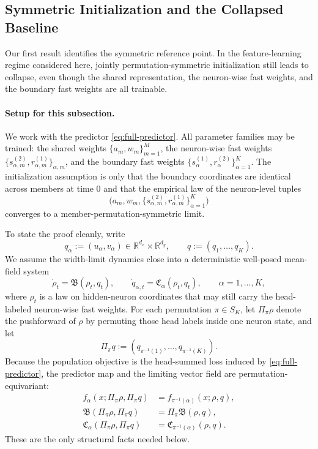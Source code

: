 \documentclass{article}
\newcommand{\R}{\mathbb{R}}
\begin{document}
\subsection{Symmetric Initialization and the Collapsed Baseline}

Our first result identifies the symmetric reference point. In the feature-learning regime considered here, jointly permutation-symmetric initialization still leads to collapse, even though the shared representation, the neuron-wise fast weights, and the boundary fast weights are all trainable.

\paragraph{Setup for this subsection.}
We work with the predictor \eqref{eq:full-predictor}. All parameter families may be trained: the shared weights $\{a_m,w_m\}_{m=1}^M$, the neuron-wise fast weights $\{s^{(2)}_{\alpha,m},r^{(1)}_{\alpha,m}\}_{\alpha,m}$, and the boundary fast weights $\{s^{(1)}_\alpha,r^{(2)}_\alpha\}_{\alpha=1}^K$. The initialization assumption is only that the boundary coordinates are identical across members at time $0$ and that the empirical law of the neuron-level tuples
\[
\bigl(a_m,w_m,\{s^{(2)}_{\alpha,m},r^{(1)}_{\alpha,m}\}_{\alpha=1}^K\bigr)
\]
converges to a member-permutation-symmetric limit.

To state the proof cleanly, write
\[
q_\alpha:=(u_\alpha,v_\alpha)\in\R^{d_x}\times\R^{d_y},
\qquad
q:=(q_1,\dots,q_K).
\]
We assume the width-limit dynamics close into a deterministic well-posed mean-field system
\[
\dot\rho_t=\mathfrak B(\rho_t,q_t),
\qquad
\dot q_{\alpha,t}=\mathfrak C_\alpha(\rho_t,q_t),
\qquad
\alpha=1,\dots,K,
\]
where $\rho_t$ is a law on hidden-neuron coordinates that may still carry the head-labeled neuron-wise fast weights. For each permutation $\pi\in S_K$, let $\Pi_\pi\rho$ denote the pushforward of $\rho$ by permuting those head labels inside one neuron state, and let
\[
\Pi_\pi q:=(q_{\pi^{-1}(1)},\dots,q_{\pi^{-1}(K)}).
\]
Because the population objective is the head-summed loss induced by \eqref{eq:full-predictor}, the predictor map and the limiting vector field are permutation-equivariant:
\begin{align}
f_\alpha(x;\Pi_\pi\rho,\Pi_\pi q)
&=
f_{\pi^{-1}(\alpha)}(x;\rho,q),
\label{eq:paper-perm-pred}\\
\mathfrak B(\Pi_\pi\rho,\Pi_\pi q)
&=
\Pi_\pi\mathfrak B(\rho,q),
\label{eq:paper-perm-rho}\\
\mathfrak C_\alpha(\Pi_\pi\rho,\Pi_\pi q)
&=
\mathfrak C_{\pi^{-1}(\alpha)}(\rho,q).
\label{eq:paper-perm-q}
\end{align}
These are the only structural facts needed below.
\end{document}
